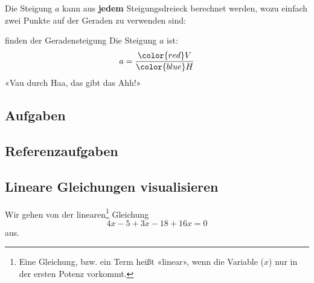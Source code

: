 Die Steigung $a$ kann aus \textbf{jedem} Steigungsdreieck berechnet werden,
wozu einfach zwei Punkte auf der Geraden zu verwenden sind:

\newpage

\begin{rezept}{finden der Geradensteigung}{}
Die Steigung $a$ ist:
$$a=\frac{{\color{red}V}}{{\color{blue}H}}$$
«Vau durch Haa, das gibt das Ahh!»
\end{rezept}


\subsection*{Aufgaben}

\newpage


\subsection{Referenzaufgaben}



\newpage


\newpage


\newpage



\TALS{
\newpage}


\subsection{Lineare Gleichungen visualisieren}
Wir gehen von der linearen\footnote{Eine Gleichung, bzw. ein Term
  heißt «linear», wenn die Variable ($x$) nur in der ersten Potenz vorkommt.} Gleichung $$4x-5+3x -18 + 16x = 0$$ aus.

